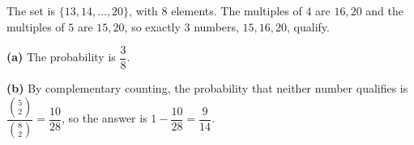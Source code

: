 The set is $\{13,14,\dots,20\}$, with $8$ elements. The multiples of $4$ are $16,20$ and the multiples of $5$ are $15,20$, so exactly $3$ numbers, $15,16,20$, qualify.

\textbf{(a)} The probability is $\boxed{\dfrac38}$.

\textbf{(b)} By complementary counting, the probability that neither number qualifies is $\dfrac{\binom52}{\binom82}=\dfrac{10}{28}$, so the answer is $1-\dfrac{10}{28}=\boxed{\dfrac{9}{14}}$.
